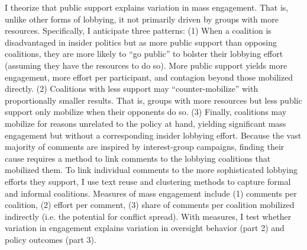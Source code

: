 I theorize that public support explains variation in mass engagement. That is, unlike other forms of lobbying, it not primarily driven by groups with more resources. Specifically, I anticipate three patterns:
(1) When a coalition is disadvantaged in insider politics but as more public support than opposing coalitions, they are more likely to ``go public'' to bolster their lobbying effort (assuming they have the resources to do so). More public support yields more engagement, more effort per participant, and contagion beyond those mobilized directly. (2) Coalitions with less support may ``counter-mobilize'' with proportionally smaller results. That is, groups with more resources but less public support only mobilize when their opponents do so. (3) Finally, coalitions may mobilize for reasons unrelated to the policy at hand, yielding significant mass engagement but without a corresponding insider lobbying effort. 
Because the vast majority of comments are inspired by interest-group campaigns, finding their cause requires a method to link comments to the lobbying coalitions that mobilized them.  
To link individual comments to the more sophisticated lobbying efforts they support, I use text reuse and clustering methods to capture formal and informal coalitions.
Measures of mass engagement include 
(1) comments per coalition, %
(2) effort per comment, %
(3) share of comments per coalition mobilized indirectly (i.e. the potential for conflict spread).
With measures, I test whether variation in engagement explains variation in oversight behavior (part 2) and policy outcomes (part 3).

